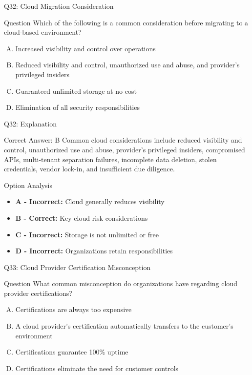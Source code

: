 \documentclass{beamer}
\begin{document}
	\begin{frame}{Q32: Cloud Migration Consideration}
		\begin{block}{Question}
			Which of the following is a common consideration before migrating to a cloud-based environment?
		\end{block}
		\begin{enumerate}[(A)]
			\item Increased visibility and control over operations
			\item Reduced visibility and control, unauthorized use and abuse, and provider's privileged insiders
			\item Guaranteed unlimited storage at no cost
			\item Elimination of all security responsibilities
		\end{enumerate}
	\end{frame}
	
	\begin{frame}{Q32: Explanation}
		\begin{block}{Correct Answer: B}
			Common cloud considerations include reduced visibility and control, unauthorized use and abuse, provider's privileged insiders, compromised APIs, multi-tenant separation failures, incomplete data deletion, stolen credentials, vendor lock-in, and insufficient due diligence.
		\end{block}
		\begin{block}{Option Analysis}
			\begin{itemize}
				\item \textbf{A - Incorrect:} Cloud generally reduces visibility
				\item \textbf{B - Correct:} Key cloud risk considerations
				\item \textbf{C - Incorrect:} Storage is not unlimited or free
				\item \textbf{D - Incorrect:} Organizations retain responsibilities
			\end{itemize}
		\end{block}
	\end{frame}
	
	\begin{frame}{Q33: Cloud Provider Certification Misconception}
		\begin{block}{Question}
			What common misconception do organizations have regarding cloud provider certifications?
		\end{block}
		\begin{enumerate}[(A)]
			\item Certifications are always too expensive
			\item A cloud provider's certification automatically transfers to the customer's environment
			\item Certifications guarantee 100\% uptime
			\item Certifications eliminate the need for customer controls
		\end{enumerate}
	\end{frame}
	
\end{document}
